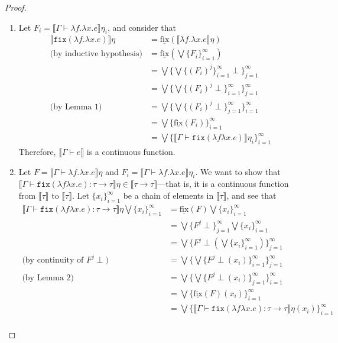 \documentclass{westhesis}
\theoremstyle{plain}
\theoremstyle{definition}
\begin{document}
\begin{proof}
\begin{itemize}
 \begin{enumerate}
\item Let $F_i = \llbracket \Gamma \vdash \lambda f. \lambda x.e\rrbracket\eta_i$, and consider that 
 \begin{align*}
 \llbracket \texttt{fix} (\lambda f.\lambda x.e)\rrbracket\eta &= \underline{\text{fix}}(\llbracket \lambda f. \lambda x.e 
 \rrbracket\eta)\\
 \text{(by inductive hypothesis)} &= \underline{\text{fix}}(\bigvee\{F_i\}^{\infty}_{i=1}) \\
 &= \bigvee\{\bigvee\{(F_i)^j \}^{\infty}_{i=1}\perp\}^{\infty}_{j=1} \\
 &= \bigvee\{\bigvee\{(F_i)^j \perp\}^{\infty}_{i=1}\}^{\infty}_{j=1} \\ 
\text{(by Lemma 1)} &= \bigvee\{\bigvee\{(F_i)^j \perp\}^{\infty}_{j=1}\}^{\infty}_{i=1} \\ 
&= \bigvee\{\underline{\text{fix}}(F_i)\}^{\infty}_{i=1}\\
&= \bigvee\{\llbracket \Gamma \vdash \texttt{fix}(\lambda f \lambda x.e)\rrbracket\eta_i\}^{\infty}_{i=1}
 \end{align*}
 Therefore, $\llbracket \Gamma \vdash e \rrbracket$ is a continuous function.
 \item Let $F = \llbracket \Gamma \vdash \lambda f. \lambda x.e\rrbracket\eta$ and $F_i = \llbracket \Gamma \vdash \lambda 
 f. \lambda x.e\rrbracket\eta_i$. We want to show that $\llbracket\Gamma\vdash\texttt{fix}(\lambda f \lambda x.e) : \tau 
 \rightarrow\tau\rrbracket\eta \in \llbracket \tau \rightarrow \tau \rrbracket$---that is, it is a continuous function from $\llbracket 
 \tau \rrbracket$ to $\llbracket \tau \rrbracket$. Let $\{x_i\}^{\infty}_{i=1}$ be a chain of elements in $\llbracket \tau \rrbracket$,
  and see that 
 \begin{align*}
 \llbracket\Gamma\vdash\texttt{fix}(\lambda f \lambda x.e) : \tau \rightarrow\tau\rrbracket\eta \bigvee\{x_i\}^{\infty}_{i=1}&= 
 \underline{\text{fix}}(F)\bigvee\{x_i\}^{\infty}_{i=1}\\
 &=\bigvee\{F^j \perp\}^{\infty}_{j=1}\bigvee\{x_i\}^{\infty}_{i=1}\\
 &= \bigvee\{F^j \perp(\bigvee\{x_i\}^{\infty}_{i=1})\}^{\infty}_{j=1}\\ 
 \text{(by continuity of $F^j \perp$) }&= \bigvee\{\bigvee\{F^j \perp(x_i)\}^{\infty}_{i=1}\}^{\infty}_{j=1}\\ 
 \text{(by Lemma 2)} &=\bigvee\{\bigvee\{F^j \perp(x_i)\}^{\infty}_{j=1}\}^{\infty}_{i=1}\\
 &= \bigvee\{\underline{\text{fix}}(F)(x_i)\}^{\infty}_{i=1}\\
 &= \bigvee\{\llbracket\Gamma\vdash\texttt{fix}(\lambda f \lambda x.e) : \tau \rightarrow\tau\rrbracket\eta(x_i)\}^{\infty}_{i=1}\\
 \end{align*}
 \end{enumerate}
 \end{itemize}
 \end{proof}
\end{document}
